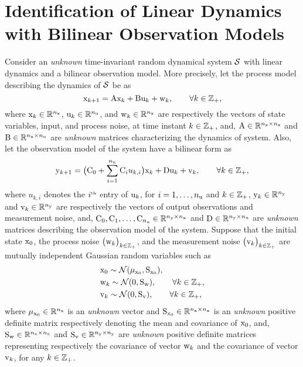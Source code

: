 \section{Identification of Linear Dynamics with Bilinear Observation Models} \label{sec:pf}
Consider an \emph{unknown} time-invariant random dynamical system ${\mathcal{S}}$ with linear dynamics and a bilinear observation model.  
More precisely, let the process model describing the dynamics of ${\mathcal{S}}$ be as
\begin{equation}\label{eqn:dynamics1}
{ \mathrm{x} }_{k+1} = { \mathrm{A} }{ \mathrm{x} }_k+{ \mathrm{B} }{ \mathrm{u} }_k+{ \mathrm{w} }_k,    \qquad \forall k\in{\mathbb{Z}}_+,
\end{equation}
where ${ \mathrm{x} }_{k}\in{\mathbb{R}}^{n_{ \mathrm{x} }}$, ${ \mathrm{u} }_k\in{\mathbb{R}}^{n_{ \mathrm{u} }}$, and ${ \mathrm{w} }_k\in{\mathbb{R}}^{n_{ \mathrm{x} }}$ are respectively the vectors of state variables, input, and process noise, at time instant $k\in{\mathbb{Z}}_+$, and,
${ \mathrm{A} }\in{\mathbb{R}}^{n_{ \mathrm{x} }\times n_{ \mathrm{x} }}$ and ${ \mathrm{B} }\in{\mathbb{R}}^{n_{ \mathrm{x} }\times n_{ \mathrm{u} }}$ are \emph{unknown} matrices characterizing the dynamics of system.
Also, let the observation model of the system have a bilinear form as 
\begin{equation}\label{eqn:dynamics2}
{ \mathrm{y} }_{k+1} = \big({ \mathrm{C} }_0+\sum_{i=1}^{n_{ \mathrm{u} }}{ \mathrm{C} }_iu_{k,i}\big){ \mathrm{x} }_k+{ \mathrm{D} }{ \mathrm{u} }_k+{ \mathrm{v} }_k,       \qquad \forall k\in{\mathbb{Z}}_+,
\end{equation}
where $u_{k, i}$ denotes the $i^{\text{\tiny{th}}}$ entry of ${ \mathrm{u} }_k$, for $i=1,\ldots,n_{ \mathrm{u} }$ and $k\in{\mathbb{Z}}_+$, ${ \mathrm{y} }_{k}\in{\mathbb{R}}^{n_{ \mathrm{y} }}$ and ${ \mathrm{v} }_k\in{\mathbb{R}}^{n_{ \mathrm{y} }}$  are respectively the vectors of output observations and measurement noise, and, ${ \mathrm{C} }_0,{ \mathrm{C} }_1,\ldots,{ \mathrm{C} }_{n_{ \mathrm{u} }}\in{\mathbb{R}}^{n_{ \mathrm{y} }\times n_{ \mathrm{x} }}$ and ${ \mathrm{D} }\in{\mathbb{R}}^{n_{ \mathrm{y} }\times n_{ \mathrm{u} }}$ are \emph{unknown} matrices describing the observation model of the system. Suppose that the initial state ${ \mathrm{x} }_0$, the process noise $\big({ \mathrm{w} }_k\big)_{k\in{\mathbb{Z}}_+}$, and the measurement noise $\big({ \mathrm{v} }_k\big)_{k\in{\mathbb{Z}}_+}$ are mutually independent Gaussian random variables such as %
\begin{align}
    &{ \mathrm{x} }_0\sim{\mathcal{N}}(\mu_{{ \mathrm{x} }_0},{ \mathrm{S} }_{{ \mathrm{x} }_0}),
    \label{eqn:x_dist_Gaussion}
    \\
    &{ \mathrm{w} }_k\sim{\mathcal{N}}(0,{ \mathrm{S} }_{{ \mathrm{w} }}), \qquad \forall k\in{\mathbb{Z}}_+,
    \label{eqn:w_dist_Gaussion}
    \\
    &{ \mathrm{v} }_k\sim{\mathcal{N}}(0,{ \mathrm{S} }_{{ \mathrm{v} }}), \qquad \forall k\in{\mathbb{Z}}_+,
    \label{eqn:v_dist_Gaussion}
\end{align}
where $\mu_{{ \mathrm{x} }_0}\in{\mathbb{R}}^{n_{ \mathrm{x} }}$ is  an \emph{unknown} vector and ${ \mathrm{S} }_{{ \mathrm{x} }_0}\in{\mathbb{R}}^{n_{ \mathrm{x} }\times n_{ \mathrm{x} }}$ is an \emph{unknown} positive definite matrix  respectively denoting the mean and covariance of ${ \mathrm{x} }_0$, and, ${ \mathrm{S} }_{{ \mathrm{w} }}\in{\mathbb{R}}^{n_{ \mathrm{x} }\times n_{ \mathrm{x} }}$  and  ${ \mathrm{S} }_{{ \mathrm{v} }}\in{\mathbb{R}}^{n_{ \mathrm{y} }\times n_{ \mathrm{y} }}$ are \emph{unknown} positive definite matrices representing respectively the covariance of vector ${ \mathrm{w} }_k$ and  the covariance of vector ${ \mathrm{v} }_k$, for any $k\in{\mathbb{Z}}_+$.  


